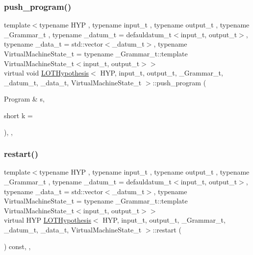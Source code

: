 \subsubsection{\texorpdfstring{push\+\_\+program()}{push\_program()}}
{\footnotesize\ttfamily template$<$typename H\+YP , typename input\+\_\+t , typename output\+\_\+t , typename \+\_\+\+Grammar\+\_\+t , typename \+\_\+datum\+\_\+t  = defauldatum\+\_\+t$<$input\+\_\+t, output\+\_\+t$>$, typename \+\_\+data\+\_\+t  = std\+::vector$<$\+\_\+datum\+\_\+t$>$, typename Virtual\+Machine\+State\+\_\+t  = typename \+\_\+\+Grammar\+\_\+t\+::template Virtual\+Machine\+State\+\_\+t$<$input\+\_\+t, output\+\_\+t$>$$>$ \\
virtual void \hyperlink{class_l_o_t_hypothesis}{L\+O\+T\+Hypothesis}$<$ H\+YP, input\+\_\+t, output\+\_\+t, \+\_\+\+Grammar\+\_\+t, \+\_\+datum\+\_\+t, \+\_\+data\+\_\+t, Virtual\+Machine\+State\+\_\+t $>$\+::push\+\_\+program (\begin{DoxyParamCaption}\item[{Program \&}]{s,  }\item[{short}]{k = {} }\end{DoxyParamCaption})\hspace{0.3cm}{\ttfamily [inline]}, {\ttfamily [override]}, {\ttfamily [virtual]}}

\mbox{\label{class_l_o_t_hypothesis_a0791b7ba0105870a2094877445570b61}} 
\subsubsection{\texorpdfstring{restart()}{restart()}}
{\footnotesize\ttfamily template$<$typename H\+YP , typename input\+\_\+t , typename output\+\_\+t , typename \+\_\+\+Grammar\+\_\+t , typename \+\_\+datum\+\_\+t  = defauldatum\+\_\+t$<$input\+\_\+t, output\+\_\+t$>$, typename \+\_\+data\+\_\+t  = std\+::vector$<$\+\_\+datum\+\_\+t$>$, typename Virtual\+Machine\+State\+\_\+t  = typename \+\_\+\+Grammar\+\_\+t\+::template Virtual\+Machine\+State\+\_\+t$<$input\+\_\+t, output\+\_\+t$>$$>$ \\
virtual H\+YP \hyperlink{class_l_o_t_hypothesis}{L\+O\+T\+Hypothesis}$<$ H\+YP, input\+\_\+t, output\+\_\+t, \+\_\+\+Grammar\+\_\+t, \+\_\+datum\+\_\+t, \+\_\+data\+\_\+t, Virtual\+Machine\+State\+\_\+t $>$\+::restart (\begin{DoxyParamCaption}{ }\end{DoxyParamCaption}) const\hspace{0.3cm}{\ttfamily [inline]}, {\ttfamily [override]}, {\ttfamily [virtual]}}

